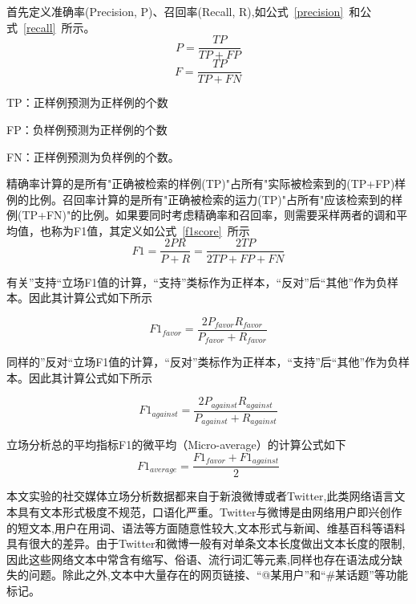 首先定义准确率(Precision, P)、召回率(Recall, R),如公式~\ref{precision}~和公式~\ref{recall}~所示。
\begin{equation}\label{precision}P=\frac{TP}{TP+FP}\end{equation}
\begin{equation}\label{recall}F=\frac{TP}{TP+FN}\end{equation}

TP：正样例预测为正样例的个数

FP：负样例预测为正样例的个数

FN：正样例预测为负样例的个数。

精确率计算的是所有"正确被检索的样例(TP)"占所有"实际被检索到的(TP+FP)样例的比例。召回率计算的是所有"正确被检索的运力(TP)"占所有"应该检索到的样例(TP+FN)"的比例。如果要同时考虑精确率和召回率，则需要采样两者的调和平均值，也称为F1值，其定义如公式~\ref{f1score}~所示
\begin{equation}\label{f1score}F1=\frac{2PR}{P+R}=\frac{2TP}{2TP+FP+FN}\end{equation}

有关”支持“立场F1值的计算，“支持”类标作为正样本，“反对”后“其他”作为负样本。因此其计算公式如下所示

\begin{equation}\label{f1favor}F1_{favor}=\frac{2P_{favor}R_{favor}}{P_{favor}+R_{favor}}\end{equation}

同样的”反对“立场F1值的计算，“反对”类标作为正样本，“支持”后“其他”作为负样本。因此其计算公式如下所示

\begin{equation}\label{f1against}F1_{against}=\frac{2P_{against}R_{against}}{P_{against}+R_{against}}\end{equation}

立场分析总的平均指标F1的微平均（Micro-average）的计算公式如下
\begin{equation}\label{f1average}F1_{average}=\frac{F1_{favor}+F1_{against}}{2}\end{equation}

本文实验的社交媒体立场分析数据都来自于新浪微博或者Twitter,此类网络语言文本具有文本形式极度不规范，口语化严重。Twitter与微博是由网络用户即兴创作的短文本,用户在用词、语法等方面随意性较大,文本形式与新闻、维基百科等语料具有很大的差异。由于Twitter和微博一般有对单条文本长度做出文本长度的限制,因此这些网络文本中常含有缩写、俗语、流行词汇等元素,同样也存在语法成分缺失的问题。除此之外,文本中大量存在的网页链接、“@某用户”和“\#某话题”等功能标记。

